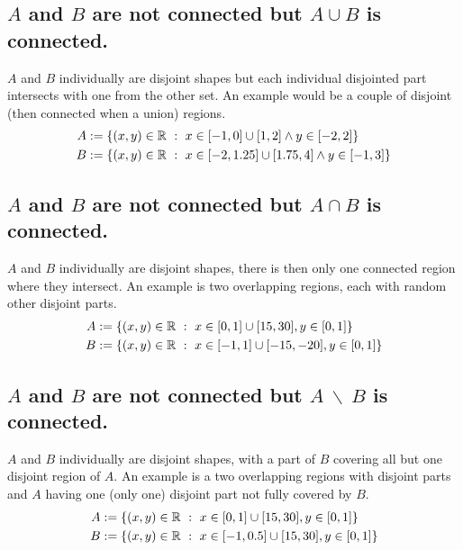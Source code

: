 \documentclass[]{article}
\newcommand{\R}{\mathbb{R}}
\newcommand{\st}{\ : \ }
\begin{document}
\subsection{$A$ and $B$ are not connected but $A \cup B$ is connected.}
$A$ and $B$ individually are disjoint shapes but each individual disjointed part intersects with one from the other set. An example would be a couple of disjoint (then connected when a union) regions.
\begin{align*}
    A &:= \qty{(x,y) \in \R \st x \in [-1,0] \cup [1,2] \land y \in [-2,2]}\\
    B &:= \qty{(x,y) \in \R \st x \in [-2,1.25] \cup [1.75,4] \land y \in [-1,3]}
\end{align*}

\subsection{$A$ and $B$ are not connected but $A \cap B$ is connected.}
$A$ and $B$ individually are disjoint shapes, there is then only one connected region where they intersect. An example is two overlapping regions, each with random other disjoint parts.
\begin{align*}
    A &:= \qty{(x,y) \in \R \st x \in [0,1] \cup [15,30], y \in [0,1]}\\
    B &:= \qty{(x,y) \in \R \st x \in [-1, 1] \cup [-15,-20], y \in [0,1]}
\end{align*}

\subsection{$A$ and $B$ are not connected but $A \ \backslash \ B$ is connected.}
$A$ and $B$ individually are disjoint shapes, with a part of $B$ covering all but one disjoint region of $A$. An example is a two overlapping regions with disjoint parts and $A$ having one (only one) disjoint part not fully covered by $B$.
\begin{align*}
    A &:= \qty{(x,y) \in \R \st x \in [0,1] \cup [15,30], y \in [0,1]}\\
    B &:= \qty{(x,y) \in \R \st x \in [-1, 0.5] \cup [15,30], y \in [0,1]}
\end{align*}


\newpage
\section{}
\end{document}
